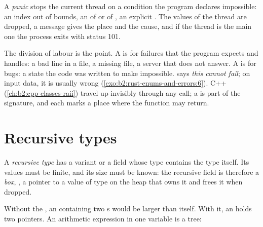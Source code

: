 \begin{definition}[Panic]\label{def:b2:rust-enums-and-errors:panic}
A \emph{panic} stops the current thread on a condition the program declares impossible: an index out of
bounds, an  of  or of , an explicit . The values of the thread are
dropped, a message gives the place and the cause, and if the thread is the main one the process exits with status
101.
\end{definition}

The division of labour is the point. A  is for failures that the program expects and handles: a bad line
in a file, a missing file, a server that does not answer. A  is for bugs: a state the code was written to make
impossible.  says \emph{this cannot fail}; on input data, it is usually wrong
(\cref{exo:b2:rust-enums-and-errors:6}). C++  (\cref{ch:b2:cpp-classes-raii}) travel up invisibly through
any call; a  is part of the signature, and each  marks a place where the function may return.

\section{Recursive types}\label{sec:b2:rust-enums-and-errors:recursive}

\begin{definition}\label{def:b2:rust-enums-and-errors:recursive}
A \emph{recursive type} has a variant or a field whose type contains the type itself. Its
values must be finite, and its size must be known: the recursive field is therefore a \emph{box},
, a pointer to a value of type  on the heap that owns it and frees it when dropped.
\end{definition}

Without the , an  containing two s would be larger than itself. With it, an  holds
two pointers. An arithmetic expression in one variable is a tree:

\label{lst:b2:rust-enums-and-errors:expr}

\label{out:b2:rust-enums-and-errors:expr}

